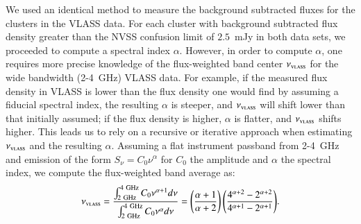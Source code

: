 \documentclass[longauth]{aa} %
\begin{document}
We used an identical method to measure the background subtracted fluxes for the clusters in the VLASS data. For each cluster with background subtracted flux density greater than the NVSS confusion limit of $2.5$~mJy in both data sets, we proceeded to compute a spectral index $\alpha$.  However, in order to compute $\alpha$, one requires more precise knowledge of the flux-weighted band center $\nu_{\textsc{vlass}}$ for the wide bandwidth (2-4~GHz) VLASS data. For example, if the measured flux density in VLASS is lower than the flux density one would find by assuming a fiducial spectral index, the resulting $\alpha$ is steeper, and $\nu_{\textsc{vlass}}$ will shift lower than that initially assumed; if the flux density is higher, $\alpha$ is flatter, and $\nu_{\textsc{vlass}}$  shifts higher.  This leads us to rely on a recursive or iterative approach when estimating $\nu_{\textsc{vlass}}$ and the resulting $\alpha$.
Assuming a flat instrument passband from 2-4~GHz and emission of the form $S_{\nu} = C_0\nu^{\alpha}$ for $C_0$ the amplitude and $\alpha$ the spectral index, we compute the flux-weighted band average as:
%
\begin{equation} \label{eq5}
\begin{split}
\nu_{\textsc{vlass}}  = \frac{\int_{2~\mathrm{GHz}}^{4~\mathrm{GHz}} C_0\nu^{\alpha+1}  d\nu}{\int_{2~\mathrm{GHz}}^{4~\mathrm{GHz}} C_0\nu^{\alpha}d\nu}
 = \left( \frac{\alpha+1}{\alpha+2} \right) \left( \frac{4^{\alpha+2}-2^{\alpha+2}}{4^{\alpha+1}-2^{\alpha+1}} \right)
\end{split}
.\end{equation}
\end{document}
